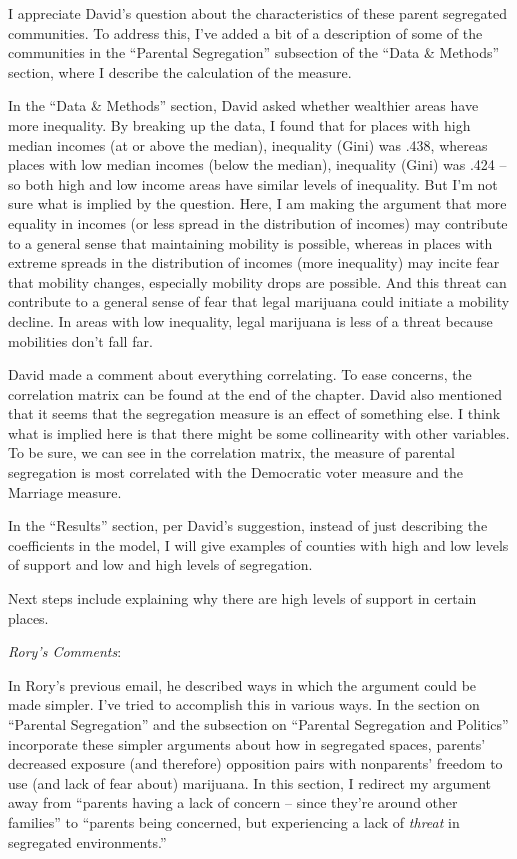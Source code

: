 \documentclass[12pt,stdletter,dateno,sigleft]{newlfm} %
\begin{document}
\begin{newlfm}
I appreciate David's question about the characteristics of these parent segregated communities. To address this, I've added a bit of a description of some of the communities in the ``Parental Segregation'' subsection of the ``Data \& Methods'' section, where I describe the calculation of the measure. 

In the ``Data \& Methods'' section, David asked whether wealthier areas have more inequality. By breaking up the data, I found that for places with high median incomes (at or above the median), inequality (Gini) was .438, whereas places with low median incomes (below the median), inequality (Gini) was .424 -- so both high and low income areas have similar levels of inequality. But I'm not sure what is implied by the question. Here, I am making the argument that more equality in incomes (or less spread in the distribution of incomes) may contribute to a general sense that maintaining mobility is possible, whereas in places with extreme spreads in the distribution of incomes (more inequality) may incite fear that mobility changes, especially mobility drops are possible. And this threat can contribute to a general sense of fear that legal marijuana could initiate a mobility decline. In areas with low inequality, legal marijuana is less of a threat because mobilities don't fall far. 

David made a comment about everything correlating. To ease concerns, the correlation matrix can be found at the end of the chapter. David also mentioned that it seems that the segregation measure is an effect of something else. I think what is implied here is that there might be some collinearity with other variables. To be sure, we can see in the correlation matrix, the measure of parental segregation is most correlated with the Democratic voter measure and the Marriage measure. 

In the ``Results'' section, per David's suggestion, instead of just describing the coefficients in the model, I will give examples of counties with high and low levels of support and low and high levels of segregation. 

Next steps include explaining why there are high levels of support in certain places. \newline

\textit{Rory's Comments}:

In Rory's previous email, he described ways in which the argument could be made simpler. I've tried to accomplish this in various ways. In the section on ``Parental Segregation'' and the subsection on ``Parental Segregation and Politics'' incorporate these simpler arguments about how in segregated spaces, parents' decreased exposure (and therefore) opposition pairs with nonparents' freedom to use (and lack of fear about) marijuana.  In this section, I redirect my argument away from ``parents having a lack of concern -- since they're around other families'' to ``parents being concerned, but experiencing a lack of \textit{threat} in segregated environments.''


\end{newlfm}
\end{document}
